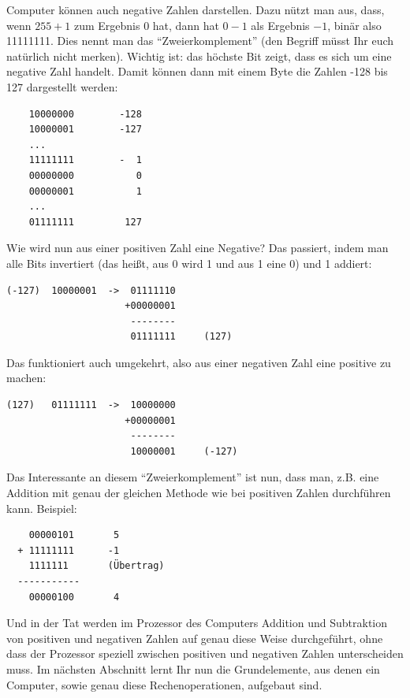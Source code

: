 Computer können auch negative Zahlen darstellen. Dazu nützt man aus, dass, wenn $255 + 1$ zum Ergebnis $0$ hat, dann hat $0-1$ als Ergebnis $-1$, binär also 11111111. Dies nennt man das ``Zweierkomplement'' (den Begriff müsst Ihr euch natürlich nicht merken). Wichtig ist: das höchste Bit zeigt, dass es sich um eine negative Zahl handelt. Damit können dann mit einem Byte die Zahlen -128 bis 127 dargestellt werden:
\begin{lstlisting}
    10000000        -128
    10000001        -127
    ...
    11111111        -  1
    00000000           0
    00000001           1
    ...
    01111111         127
\end{lstlisting}
Wie wird nun aus einer positiven Zahl eine Negative? Das passiert, indem man alle Bits invertiert (das heißt, aus 0 wird 1 und aus 1 eine 0) und 1 addiert:
\begin{lstlisting}
(-127)  10000001  ->  01111110
                     +00000001
                      --------
                      01111111     (127)
\end{lstlisting}
Das funktioniert auch umgekehrt, also aus einer negativen Zahl eine positive zu machen:
\begin{lstlisting}
(127)   01111111  ->  10000000
                     +00000001
                      --------
                      10000001     (-127)
\end{lstlisting}
Das Interessante an diesem ``Zweierkomplement'' ist nun, dass man, z.B. eine Addition mit genau der gleichen Methode wie bei positiven Zahlen durchführen kann. Beispiel:
\begin{lstlisting}
    00000101       5
  + 11111111      -1
    1111111       (Übertrag)
  -----------
    00000100       4
\end{lstlisting}
Und in der Tat werden im Prozessor des Computers Addition und Subtraktion von positiven und negativen Zahlen auf genau diese Weise durchgeführt, ohne dass der Prozessor speziell zwischen positiven und negativen Zahlen unterscheiden muss. Im nächsten Abschnitt lernt Ihr nun die Grundelemente, aus denen ein Computer, sowie genau diese Rechenoperationen, aufgebaut sind.